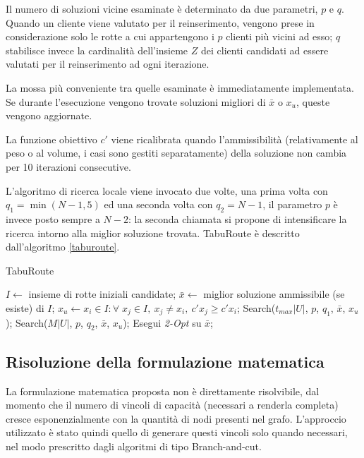 \documentclass[11pt,oneside,a4paper]{article}
\begin{document}
Il numero di soluzioni vicine esaminate è determinato da due parametri, $p$ e $q$. Quando
un cliente viene valutato per il reinserimento, vengono prese in considerazione solo
le rotte a cui appartengono i $p$ clienti più vicini ad esso; $q$ stabilisce invece la cardinalità
dell'insieme $Z$ dei clienti candidati ad essere valutati per il reinserimento ad ogni iterazione.

La mossa più conveniente tra quelle esaminate è immediatamente implementata.
Se durante l'esecuzione vengono trovate soluzioni migliori di $\bar{x}$ o $x_u$, queste
vengono aggiornate.

La funzione obiettivo $c'$ viene ricalibrata quando l'ammissibilità (relativamente al peso o
al volume, i casi sono gestiti separatamente) della soluzione non cambia per 10 iterazioni
consecutive.

L'algoritmo di ricerca locale viene invocato due volte, una prima volta con $q_1=\min(N-1,5)$
ed una seconda volta con $q_2=N-1$, il parametro $p$ è invece posto sempre a $N-2$: la seconda
chiamata si propone di intensificare la ricerca intorno alla miglior soluzione trovata.
TabuRoute è descritto dall'algoritmo \ref{taburoute}.

\begin{algorithm}
\caption{TabuRoute}
\label{taburoute}

\begin{algorithmic}[1]

  \State $I \gets$ insieme di rotte iniziali candidate;
  \State $\bar{x} \gets$ miglior soluzione ammissibile (se esiste) di $I$;
  \State $x_u \gets x_i \in I : \forall\; x_j \in I,\: x_j \neq x_i,\: c'x_j \geq c'x_i$;
  \State Search($t_{max}|U|$, $p$, $q_1$, $\bar{x}$, $x_u$);
  \State Search($M|U|$, $p$, $q_2$, $\bar{x}$, $x_u$);
  \State Esegui \emph{2-Opt} su $\bar{x}$;

\end{algorithmic}
\end{algorithm}

\subsection{Risoluzione della formulazione matematica}
La formulazione matematica proposta non è direttamente risolvibile, dal momento che il numero
di vincoli di capacità (necessari a renderla completa) cresce esponenzialmente
con la quantità di nodi presenti nel grafo. L'approccio utilizzato è stato quindi quello di generare
questi vincoli solo quando necessari, nel modo prescritto dagli algoritmi di tipo Branch-and-cut.
\end{document}
